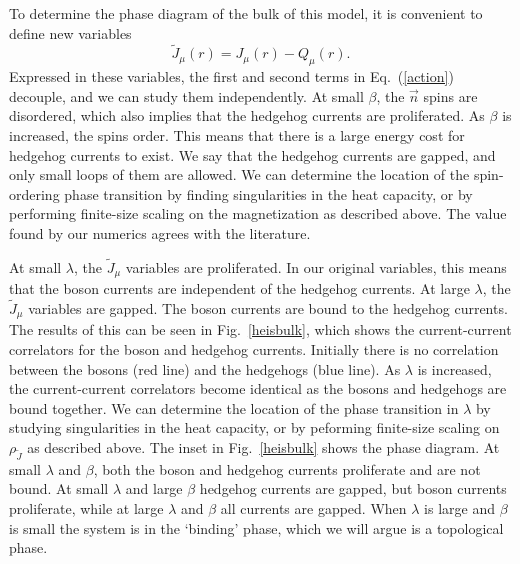 \documentclass[prb,twocolumn]{revtex4-1}
\begin{document}
To determine the phase diagram of the bulk of this model, it is convenient to define new variables
\begin{equation}
\tilde J_\mu(r)=J_\mu(r)-Q_\mu(r).
\label{shift}
\end{equation}
Expressed in these variables, the first and second terms in Eq.~(\ref{action}) decouple, and we can study them independently. 
At small $\beta$, the $\vec{n}$ spins are disordered, which also implies that the hedgehog currents are proliferated. As $\beta$ is increased, the spins order. This means that there is a large energy cost for hedgehog currents to exist. We say that the hedgehog currents are gapped, and only small loops of them are allowed. We can determine the location of the spin-ordering phase transition by finding singularities in the heat capacity, or by performing finite-size scaling on the magnetization as described above. The value found by our numerics agrees with the literature.\cite{McKenzie2}

At small $\lambda$, the $\tilde J_\mu$ variables are proliferated. In our original variables, this means that the boson currents are independent of the hedgehog currents. At large $\lambda$, the $\tilde J_\mu$ variables are gapped. The boson currents are bound to the hedgehog currents. The results of this can be seen in Fig.~\ref{heisbulk}, which shows the current-current correlators for the boson and hedgehog currents. Initially there is no correlation between the bosons (red line) and the hedgehogs (blue line). As $\lambda$ is increased, the current-current correlators become identical as the bosons and hedgehogs are bound together. We can determine the location of the phase transition in $\lambda$ by studying singularities in the heat capacity, or by peforming finite-size scaling on $\rho_{\tilde J}$ as described above. The inset in Fig.~\ref{heisbulk} shows the phase diagram. At small $\lambda$ and $\beta$, both the boson and hedgehog currents proliferate and are not bound. At small $\lambda$ and large $\beta$ hedgehog currents are gapped, but boson currents proliferate, while at large $\lambda$ and $\beta$ all currents are gapped. When $\lambda$ is large and $\beta$ is small the system is in the `binding' phase, which we will argue is a topological phase.
\end{document}
